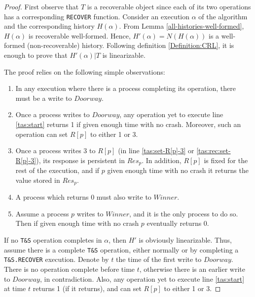 \begin{proof}
	
	First observe that $T$ is a recoverable object since each of its two operations has a corresponding \texttt{RECOVER} function. Consider an execution $\alpha$ of the algorithm and the corresponding history $H(\alpha)$. From Lemma \ref{all-histories-well-formed}, $H(\alpha)$ is recoverable well-formed. Hence, $H'(\alpha)=N(H(\alpha))$ is a well-formed (non-recoverable) history. Following definition \ref{Definition:CRL}, it is enough to prove that $H'(\alpha) | T$ is  linearizable.
	
	The proof relies on the following simple observations:
	\begin{enumerate} [noitemsep,topsep=0pt]
		\item In any execution where there is a process completing its operation, there must be a write to $Doorway$.
		\item Once a process writes to $Doorway$, any operation yet to execute line \ref{tas:start} returns 1 if given enough time with no crash. Moreover, such an operation can set $R[p]$ to either 1 or 3.
		\item Once a process writes 3 to $R[p]$ (in line \ref{tas:set-R[p]-3} or \ref{tas:rec:set-R[p]-3}), its response is persistent in $Res_p$. In addition, $R[p]$ is fixed for the rest of the execution, and if $p$ given enough time with no crash it returns the value stored in $Res_p$.
		\item A process which returns 0 must also write to $Winner$.
		\item Assume a process $p$ writes to $Winner$, and it is the only process to do so. Then if given enough time with no crash $p$ eventually returns 0.
	\end{enumerate}
	
	
	
	If no \texttt{T\&S} operation completes in $\alpha$, then $H'$ is obviously linearizable. Thus, assume there is a complete \texttt{T\&S} operation, either normally or by completing a \texttt{T\&S.RECOVER} execution. Denote by $t$ the time of the first write to $Doorway$. There is no operation complete before time $t$, otherwise there is an earlier write to $Doorway$, in contradiction. Also, any operation yet to execute line \ref{tas:start} at time $t$ returns 1 (if it returns), and can set $R[p]$ to either 1 or 3.
	

\end{proof}
